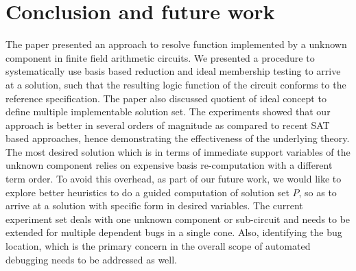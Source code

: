 \section{Conclusion and future work}
The paper presented an approach to resolve function implemented by a unknown component in finite field arithmetic circuits. We presented a procedure to systematically use \Grobner basis based reduction and ideal membership testing to arrive at a solution, such that the resulting logic function of the circuit conforms to the reference specification. The paper also discussed quotient of ideal concept to define multiple implementable solution set. The experiments showed that our approach is better in several orders of magnitude as compared to recent SAT based approaches, hence demonstrating the effectiveness of the underlying theory. The most desired solution which is in terms of immediate support variables of the unknown component relies on expensive \Grobner basis re-computation with a different term order. To avoid this overhead, as part of our future work, we would like to explore better heuristics to do a guided computation of solution set $P$, so as to arrive at a solution with specific form in desired variables. The current experiment set deals with one unknown component or sub-circuit and needs to be extended for multiple dependent bugs in a single cone. Also, identifying the bug location, which is the primary concern in the overall scope of automated debugging needs to be addressed as well. 